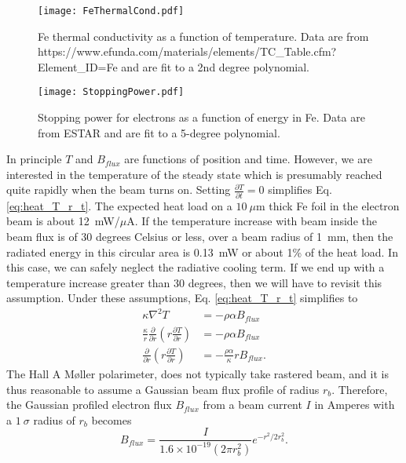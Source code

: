 \documentclass[12pt]{article}
\begin{document}
\begin{figure}[h]
\centering
\texttt{[image: FeThermalCond.pdf]}
\caption{\label{fig:conductivity} Fe thermal conductivity as a function of temperature. Data are from https://www.efunda.com/materials/elements/TC\_Table.cfm?Element\_ID=Fe and are fit to a 2nd degree polynomial.}
\end{figure}
\begin{figure}[h]
\centering
\texttt{[image: StoppingPower.pdf]}
\caption{\label{fig:stopping}Stopping power for electrons as a function of energy in Fe. Data are from ESTAR and are fit to a 5-degree polynomial.}
\end{figure}
In principle $T$ and $B_{flux}$ are functions of position and time. However, we are interested in the temperature of the steady state which is presumably reached quite rapidly when the beam turns on. Setting $\frac{\partial T}{\partial t}=0$ simplifies Eq. \ref{eq:heat_T_r_t}. The expected heat load on a $10~\mu$m thick Fe foil in the electron beam is about 12~mW/$\mu$A. If the temperature increase with beam inside the beam flux is of 30 degrees Celsius or less, over a beam radius of 1~mm, then the radiated energy in this circular area is 0.13~mW or about 1\% of the heat load. In this case, we can safely neglect the radiative cooling term. If we end up with a temperature increase greater than 30 degrees, then we will have to revisit this assumption. Under these assumptions, Eq. \ref{eq:heat_T_r_t} simplifies to  
\begin{align}
\kappa\nabla^2T&=-\rho\alpha B_{flux}\\
\frac{\kappa}{r}\frac{\partial}{\partial r}\left(r\frac{\partial T}{\partial r}\right)&=-\rho\alpha B_{flux}\\
\label{eq:heat_T_r}
\frac{\partial}{\partial r}\left(r\frac{\partial T}{\partial r}\right)&=-\frac{\rho\alpha}{\kappa}rB_{flux}.
\end{align}
The Hall A M\o ller polarimeter, does not typically take rastered beam, and it is thus reasonable to assume a Gaussian beam flux profile of radius $r_b$. Therefore, the Gaussian profiled electron flux $B_{flux}$ from a beam current $I$ in Amperes with a $1~\sigma$ radius of $r_{b}$ becomes
\begin{equation}
B_{flux}=\frac{I}{1.6\times 10^{-19} \left(2\pi r_{b}^2\right)}e^{-r^2/2r_b^2}.
\end{equation}
\end{document}

